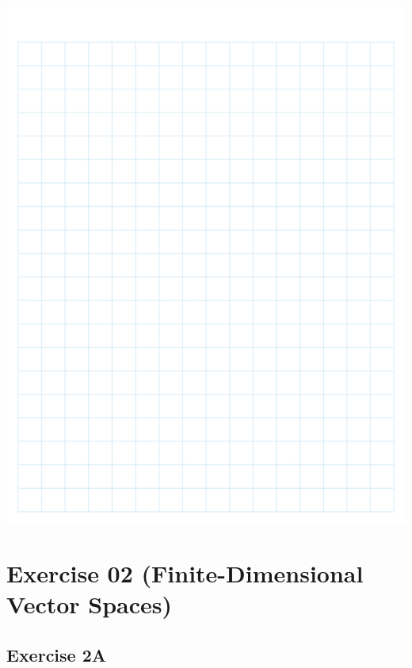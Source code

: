 \documentclass[
]{book}
\theoremstyle{definition}
\theoremstyle{definition}
\theoremstyle{definition}
\theoremstyle{definition}
\theoremstyle{remark}
\begin{document}
\begin{enumerate}
  \includegraphics{fig/Ex1C/Ex/Ex-36.png}
\end{enumerate}

\chapter{Exercise 02 (Finite-Dimensional Vector Spaces)}\label{exercise-02-finite-dimensional-vector-spaces}

\section{Exercise 2A}\label{exercise-2a}
\end{document}
